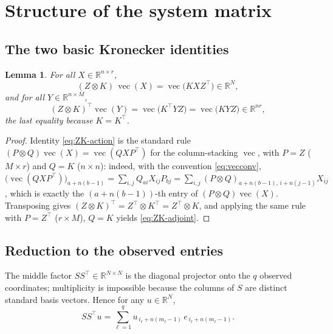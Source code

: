 \documentclass[12pt]{article}
\DeclareMathOperator{\vecop}{vec}
\newcommand{\bR}{\mathbb{R}}
\newtheorem{lemma}{Lemma}
\begin{document}
\section{Structure of the system matrix}

\subsection{The two basic Kronecker identities}

\begin{lemma}\label{lem:kron}
For all $X\in\bR^{n\times r}$,
\begin{equation}\label{eq:ZK-action}
  (Z\otimes K)\,\vecop(X)=\vecop\!\big(K X Z^{\top}\big)\in\bR^{N},
\end{equation}
and for all $Y\in\bR^{n\times M}$,
\begin{equation}\label{eq:ZK-adjoint}
  (Z\otimes K)^{\top}\vecop(Y)=\vecop\!\big(K^{\top}Y Z\big)
  =\vecop\!\big(K Y Z\big)\in\bR^{nr},
\end{equation}
the last equality because $K=K^{\top}$.
\end{lemma}

\begin{proof}
Identity \eqref{eq:ZK-action} is the standard rule
$(P\otimes Q)\vecop(X)=\vecop(QXP^{\top})$ for the column-stacking
$\vecop$, with $P=Z$ ($M\times r$) and $Q=K$ ($n\times n$): indeed, with
the convention \eqref{eq:vecconv},
$\big(\vecop(QXP^{\top})\big)_{a+n(b-1)}=\sum_{i,j}Q_{ai}X_{ij}P_{bj}
=\sum_{i,j}(P\otimes Q)_{a+n(b-1),\,i+n(j-1)}X_{ij}$, which is exactly the
$(a+n(b-1))$-th entry of $(P\otimes Q)\vecop(X)$. Transposing gives
$(Z\otimes K)^{\top}=Z^{\top}\otimes K^{\top}=Z^{\top}\otimes K$, and
applying the same rule with $P=Z^{\top}$ ($r\times M$), $Q=K$ yields
\eqref{eq:ZK-adjoint}.
\end{proof}

\subsection{Reduction to the observed entries}

The middle factor $SS^{\top}\in\bR^{N\times N}$ is the diagonal projector
onto the $q$ observed coordinates; multiplicity is impossible because the
columns of $S$ are distinct standard basis vectors. Hence for any
$u\in\bR^N$,
\begin{equation}\label{eq:proj}
  SS^{\top}u=\sum_{\ell=1}^{q}u_{\,i_\ell+n(m_\ell-1)}\,
  e_{\,i_\ell+n(m_\ell-1)} .
\end{equation}
\end{document}
